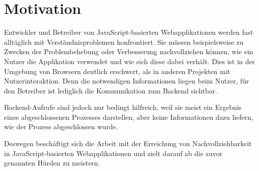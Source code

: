 \section{Motivation}


Entwickler und Betreiber von JavaScript-basierten Webapplikationen werden fast alltäglich mit Verständnisproblemen konfrontiert. Sie müssen beispielsweise zu Zwecken der Problembehebung oder Verbesserung nachvollziehen können, wie ein Nutzer die Applikation verwendet und wie sich diese dabei verhält. Dies ist in der Umgebung von Browsern deutlich erschwert, als in anderen Projekten mit Nutzerinteraktion. Denn die notwendigen Informationen liegen beim Nutzer, für den Betreiber ist lediglich die Kommunikation zum Backend sichtbar.

Backend-Aufrufe sind jedoch nur bedingt hilfreich, weil sie meist ein Ergebnis eines abgeschlossenen Prozesses darstellen, aber keine Informationen dazu liefern, wie der Prozess abgeschlossen wurde.

Deswegen beschäftigt sich die Arbeit mit der Erreichung von Nachvollziehbarkeit in JavaScript-basierten Webapplikationen und zielt darauf ab die zuvor genannten Hürden zu meistern.

%

